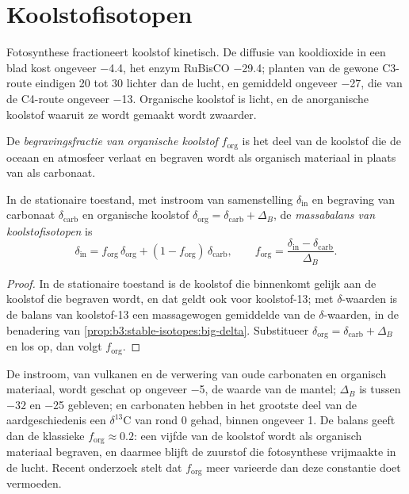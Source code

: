 \section{Koolstofisotopen}\label{sec:b3:stable-isotopes:carbon}

Fotosynthese fractioneert koolstof kinetisch. De diffusie van
kooldioxide in een blad kost ongeveer \qty{-4.4}{\permil}, het enzym RuBisCO
\qty{-29.4}{\permil}; planten van de gewone C3-route eindigen \num{20} tot
\qty{30}{\permil} lichter dan de lucht, en gemiddeld ongeveer
\qty{-27}{\permil}, die van de C4-route ongeveer \qty{-13}{\permil}. Organische
koolstof is licht, en de anorganische koolstof waaruit ze wordt gemaakt wordt zwaarder.

\begin{definition}\label{def:b3:stable-isotopes:forg}
De \emph{begravingsfractie van organische koolstof}
$f_{\mathrm{org}}$ is het deel van de koolstof die de oceaan en atmosfeer verlaat en
begraven wordt als organisch materiaal in plaats van als carbonaat.
\end{definition}

\begin{proposition}\label{prop:b3:stable-isotopes:forg}
In de stationaire toestand, met instroom van samenstelling $\delta_{\mathrm{in}}$ en begraving van
carbonaat $\delta_{\mathrm{carb}}$ en organische koolstof $\delta_{\mathrm{org}} =
\delta_{\mathrm{carb}} + \Delta_B$, de
\emph{massabalans van koolstofisotopen} is
\[
\delta_{\mathrm{in}} = f_{\mathrm{org}}\,\delta_{\mathrm{org}} + (1 - f_{\mathrm{org}})\,
\delta_{\mathrm{carb}}, \qquad f_{\mathrm{org}} = \frac{\delta_{\mathrm{in}} -
\delta_{\mathrm{carb}}}{\Delta_B}.
\]
\end{proposition}

\begin{proof}
In de stationaire toestand is de koolstof die binnenkomt gelijk aan de koolstof die begraven
wordt, en dat geldt ook voor koolstof-13; met $\delta$-waarden is de balans van koolstof-13 een massagewogen
gemiddelde van de $\delta$-waarden, in de benadering van
\cref{prop:b3:stable-isotopes:big-delta}. Substitueer $\delta_{\mathrm{org}} =
\delta_{\mathrm{carb}} + \Delta_B$ en los op, dan volgt $f_{\mathrm{org}}$.
\end{proof}

De instroom, van vulkanen en de verwering van oude carbonaten en organisch materiaal, wordt
geschat op ongeveer \qty{-5}{\permil}, de waarde van de mantel; $\Delta_B$ is
tussen $-32$ en \qty{-25}{\permil} gebleven; en carbonaten hebben
in het grootste deel van de aardgeschiedenis een $\delta^{13}\mathrm C$ van rond 0 gehad,
binnen ongeveer \qty{1}{\permil}. De balans geeft dan de klassieke $f_{\mathrm{org}} \approx
0.2$: een vijfde van de koolstof wordt als organisch materiaal begraven, en daarmee
blijft de zuurstof die fotosynthese vrijmaakte in de lucht. Recent onderzoek stelt dat
$f_{\mathrm{org}}$ meer varieerde dan deze constantie doet vermoeden.

